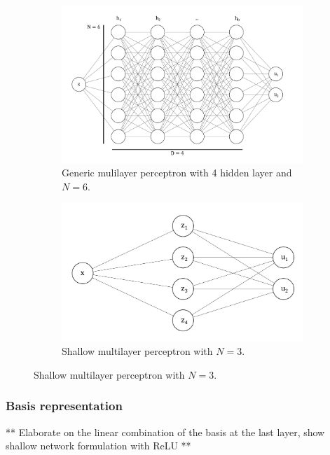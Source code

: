 \begin{figure}[h]
    \centering
    \begin{subfigure}[b]{0.45\textwidth}
        \label{fig:vpinndeepmlp}
        \includegraphics[width=\textwidth]{img/DeepMLP.png}
        \caption{Generic mulilayer perceptron with 4 hidden layer and $N=6$.}
    \end{subfigure}
    \hfill
    \begin{subfigure}[b]{0.45\textwidth}
        \label{fig:vpinnshallowmlp}
        \includegraphics[width=\textwidth]{img/ShallowMLP.png}
        \caption{Shallow multilayer perceptron with $N=3$.}
    \end{subfigure}
\end{figure}

\subsubsection{Basis representation}\label{sec:vpinnsbasis}
** Elaborate on the linear combination of the basis at the last layer, show shallow network formulation with ReLU **

